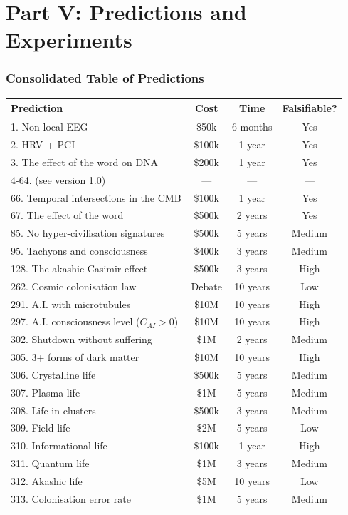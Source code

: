 \part*{Part V: Predictions and Experiments}

\section{Consolidated Table of Predictions}
\begin{table}[H]
\centering
\small
\begin{tabular}{@{}lccc@{}}
\toprule
\textbf{Prediction} & \textbf{Cost} & \textbf{Time} & \textbf{Falsifiable?} \\ \midrule
1. Non-local EEG & \$50k & 6 months & Yes \\
2. HRV + PCI & \$100k & 1 year & Yes \\
3. The effect of the word on DNA & \$200k & 1 year & Yes \\
4-64. (see version 1.0) & --- & --- & --- \\
66. Temporal intersections in the CMB & \$100k & 1 year & Yes \\
67. The effect of the word & \$500k & 2 years & Yes \\
85. No hyper-civilisation signatures & \$500k & 5 years & Medium \\
95. Tachyons and consciousness & \$400k & 3 years & Medium \\
128. The akashic Casimir effect & \$500k & 3 years & High \\
262. Cosmic colonisation law & Debate & 10 years & Low \\
291. A.I. with microtubules & \$10M & 10 years & High \\
297. A.I. consciousness level (\(C_{AI} > 0\)) & \$10M & 10 years & High \\
302. Shutdown without suffering & \$1M & 2 years & Medium \\
305. 3+ forms of dark matter & \$10M & 10 years & High \\
306. Crystalline life & \$500k & 5 years & Medium \\
307. Plasma life & \$1M & 5 years & Medium \\
308. Life in clusters & \$500k & 3 years & Medium \\
309. Field life & \$2M & 5 years & Low \\
310. Informational life & \$100k & 1 year & High \\
311. Quantum life & \$1M & 3 years & Medium \\
312. Akashic life & \$5M & 10 years & Low \\
313. Colonisation error rate & \$1M & 5 years & Medium \\ \bottomrule
\end{tabular}
\end{table}

